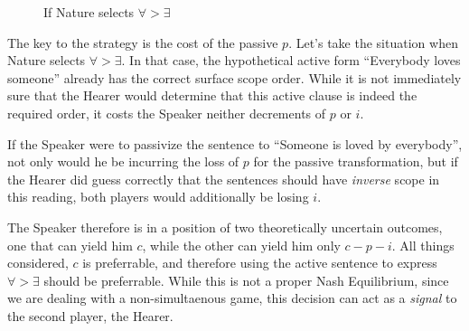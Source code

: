\documentclass{article}
\begin{document}
\begin{figure}
\centering
{}
\caption{If Nature selects $\forall>\exists$\label{all}}
\end{figure}

The key to the strategy is the cost of the passive $p$.
Let's take the situation when Nature selects ${\forall}>{\exists}$.
In that case, the hypothetical active form ``Everybody loves someone'' already has the correct surface scope order.
While it is not immediately sure that the Hearer would determine that this active clause is indeed the required order, it costs the Speaker neither decrements of $p$ or $i$.

If the Speaker were to passivize the sentence to ``Someone is loved by everybody'', not only would he be incurring the loss of $p$ for the passive transformation, but if the Hearer did guess correctly that the sentences should have \emph{inverse} scope in this reading, both players would additionally be losing $i$.

The Speaker therefore is in a position of two theoretically uncertain outcomes, one that can yield him $c$, while the other can yield him only $c-p-i$.
All things considered, $c$ is preferrable, and therefore using the active sentence to express ${\forall}>{\exists}$ should be preferrable.
While this is not a proper Nash Equilibrium, since we are dealing with a non-simultaenous game, this decision can act as a \emph{signal} to the second player, the Hearer.
\end{document}
